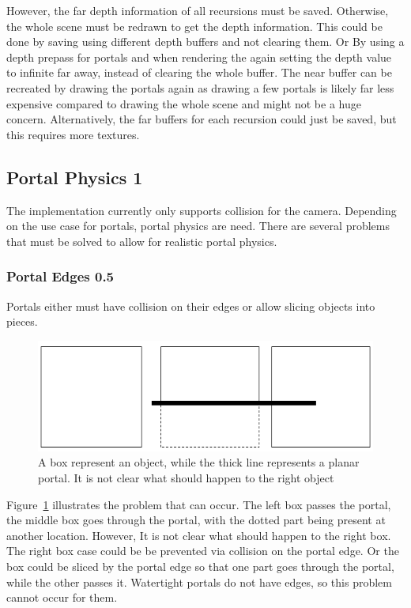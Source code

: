However, the far depth information of all recursions must be saved. Otherwise, the whole scene must be redrawn to get the depth information. This could be done by saving using different depth buffers and not clearing them. Or By using a depth prepass for portals and when rendering the again setting the depth value to infinite far away, instead of clearing the whole buffer. The near buffer can be recreated by drawing the portals again as drawing a few portals is likely far less expensive compared to drawing the whole scene and might not be a huge concern. Alternatively, the far buffers for each recursion could just be saved, but this requires more textures.


\subsection{Portal Physics 1}
\label{section:portalphysics}
The implementation currently only supports collision for the camera. Depending on the use case for portals, portal physics are need. There are several problems that must be solved to allow for realistic portal physics.

\subsubsection{Portal Edges 0.5}
Portals either must have collision on their edges or allow slicing objects into pieces.

\begin{figure}[h]
	\centering
	\includegraphics[width=\linewidth]{images/edgecollision.png}
	\caption{A box represent an object, while the thick line represents a planar portal. It is not clear what should happen to the right object}
	\label{fig:edgecollision}
\end{figure}

Figure~\ref{fig:edgecollision} illustrates the problem that can occur. The left box passes the portal, the middle box goes through the portal, with the dotted  part being present at another location. However, It is not clear what should happen to the right box. The right box case could be  be prevented via collision on the portal edge.  Or the box could be sliced by the portal edge so that one part goes through the portal, while the other passes it. Watertight portals do not have edges, so this problem cannot occur for them.

